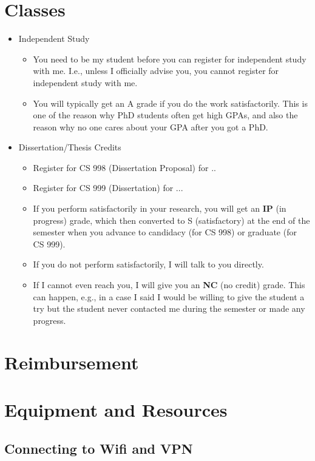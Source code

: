 \documentclass[oneside,11pt]{book}
\begin{document}
\part{Classes}

\begin{itemize}
\item Independent Study
\begin{itemize}
    \item You need to be my student before you can register for independent study with me.  I.e., unless I officially advise you, you cannot register for independent study with me.
    \item You will typically get an A grade if you do the work satisfactorily. This is one of the reason why PhD students often get high GPAs, and also the reason why no one cares about your GPA after you got a PhD.
\end{itemize}
\item Dissertation/Thesis Credits
\begin{itemize}
    \item Register for CS 998 (Dissertation Proposal) for ..  
    \item Register for CS 999 (Dissertation) for ...
    \item If you perform satisfactorily in your research, you will get an \textbf{IP} (in progress) grade, which then converted to S (satisfactory) at the end of the semester when you advance to candidacy (for CS 998) or graduate (for CS 999).
    \item If you do not perform satisfactorily, I will talk to you directly. 
    \item If I cannot even reach you, I will give you an \textbf{NC} (no credit) grade. This can happen, e.g., in a case I said I would be willing to give the student a try but the student never contacted me during the semester or made any progress. 
\end{itemize}
\end{itemize}




\part{Reimbursement}



\part{Equipment and Resources}
\chapter{Connecting to Wifi and VPN}
\end{document}
